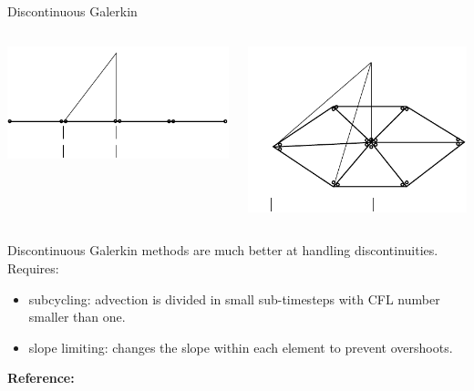 \documentclass[12pt]{beamer}
\begin{document}
\begin{frame}{Discontinuous Galerkin}
  \begin{columns}
  \begin{column}{0.5\textwidth}
    \includegraphics[width=\textwidth,clip,trim=0 30 0
    0]{P1dgshapefunction1d_tex}
  \end{column}
  \begin{column}{0.5\textwidth}
    \includegraphics[width=\textwidth,clip,trim=0 20 0
    0]{P1dgshapefunction2d_tex}
  \end{column}
  \end{columns}
  Discontinuous Galerkin methods are much better at handling discontinuities.
  Requires:
  \begin{itemize}
    \item subcycling: advection is divided in small sub-timesteps 
      with CFL number smaller than one.
    \item slope limiting: changes the slope within each element to
      prevent overshoots.
  \end{itemize}
  {\bf Reference:} \cite{Cockburn2001}
\end{frame}
\end{document}
